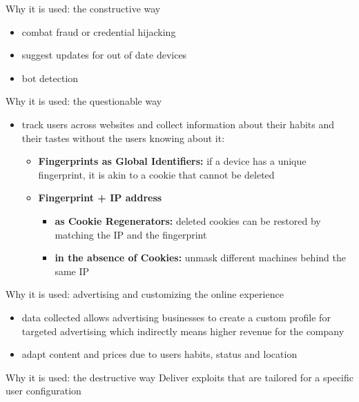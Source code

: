 \begin{frame}{Why it is used: the constructive way}
  \begin{itemize}
    \item combat fraud or credential hijacking
    \item suggest updates for out of date devices
    \item bot detection
  \end{itemize}
\end{frame}

\begin{frame}{Why it is used: the questionable way}
  \begin{itemize}
    \item track users across websites and collect information about their habits and their tastes without the users knowing about it:
          \begin{itemize}
            \item \textbf{Fingerprints as Global Identifiers:} if a device has a unique fingerprint, it is akin to a cookie that cannot be deleted
            \item \textbf{Fingerprint + IP address}
                  \begin{itemize}
                    \item \textbf{as Cookie Regenerators:} deleted cookies can be restored by matching the IP and the fingerprint
                    \item \textbf{in the absence of Cookies:} unmask different machines behind the same IP
                  \end{itemize}
          \end{itemize}
  \end{itemize}
\end{frame}

\begin{frame}{Why it is used: advertising and customizing the online experience}
  \begin{itemize}
    \item data collected allows advertising businesses to create a custom profile for targeted advertising which indirectly means higher revenue for the company
    \item adapt content and prices due to users habits, status and location
  \end{itemize}
\end{frame}

\begin{frame}{Why it is used: the destructive way}
  Deliver exploits that are tailored for a specific user configuration
\end{frame}
